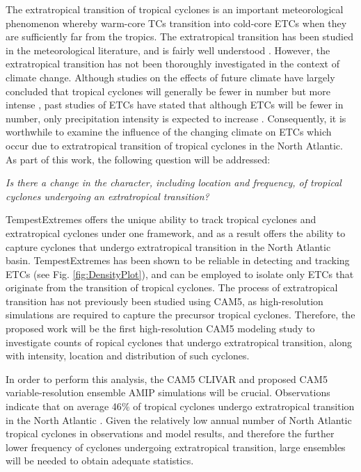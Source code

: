 \documentclass[11pt]{article}
\begin{document}
The extratropical transition of tropical cyclones is an important meteorological phenomenon whereby warm-core TCs transition into cold-core ETCs when they are sufficiently far from the tropics.  The extratropical transition has been studied in the meteorological literature, and is fairly well understood \citep{hart2001climatology}.  However, the extratropical transition has not been thoroughly investigated in the context of climate change.  Although studies on the effects of future climate have largely concluded that tropical cyclones will generally be fewer in number but more intense \citep{Knutson2010}, past studies of ETCs have stated that although ETCs will be fewer in number, only precipitation intensity is expected to increase \citep{bengtsson2009will}.  Consequently, it is worthwhile to examine the influence of the changing climate on ETCs which occur due to extratropical transition of tropical cyclones in the North Atlantic.  As part of this work, the following question will be addressed:

\emph{Is there a change in the character, including location and frequency, of tropical cyclones undergoing an extratropical transition?}

TempestExtremes offers the unique ability to track tropical cyclones and extratropical cyclones under one framework, and as a result offers the ability to capture cyclones that undergo extratropical transition in the North Atlantic basin.  TempestExtremes has been shown to be reliable in detecting and tracking ETCs (see Fig. \ref{fig:DensityPlot}), and can be employed to isolate only ETCs that originate from the transition of tropical cyclones. The process of extratropical transition has not previously been studied using CAM5, as high-resolution simulations are required to capture the precursor tropical cyclones. Therefore, the proposed work will be the first high-resolution CAM5 modeling study to investigate counts of ropical cyclones that undergo extratropical transition, along with intensity, location and distribution of such cyclones.  

In order to perform this analysis, the CAM5 CLIVAR and proposed CAM5 variable-resolution ensemble AMIP simulations will be crucial.  Observations indicate that on average 46$\%$ of tropical cyclones undergo extratropical transition in the North Atlantic \citep{hart2001climatology}. Given the relatively low annual number of North Atlantic tropical cyclones in observations and model results, and therefore the further lower frequency of cyclones undergoing extratropical transition, large ensembles will be needed to obtain adequate statistics.
\end{document}
